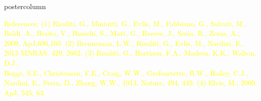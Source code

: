 \documentclass[final]{beamer}
\begin{document}
\begin{frame}
\begin{columns}
\begin{column}{.5\textwidth}
\begin{beamercolorbox}[center,wd=\textwidth]{postercolumn}
\begin{minipage}[T]{.97\textwidth}
{		  \textcolor{yellow}{\tiny{\vspace{-20pt} References: (1) Risaliti, G., Miniutti, G., Evlis, M., Fabbiano, G., Salvati, M., Baldi, A., Braito, V., 
		  Bianchi, S., Matt, G., Reeves, J., Soria, R., Zezas, A., \\ \vspace{-20pt} 2009, ApJ,696,160. (2) Brenneman, L.W., Risaliti, G., Evlis, M., Nardini, E., 2013 MNRAS, 
		  429, 2662.  (3) Risaliti, G., Harrison, F.A., Madsen, K.K., Walton, D.J.,\\ \vspace{-20pt} Boggs, S.E., Christensen,  F.E., Craig, W.W., Grefenstette, B.W., 
		  Hailey, C.J., Nardini, E., Stern, D., Zhang, W.W., 1013, Nature, 494, 449. (4) Elvis, M., 2000, \\ \vspace{-20pt} ApJ, 545, 63.}}
		 
		  \vfill		

      
	} %

          


        \end{minipage}
      \end{beamercolorbox}
    \end{column}

  \end{columns}

\end{frame}
\end{document}
